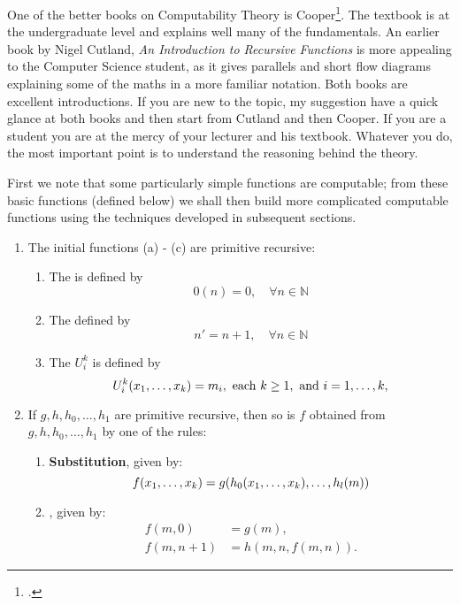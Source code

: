 One of the better books on Computability Theory is Cooper\footcite{cooper2004}. The textbook is at the undergraduate level and explains well many of the fundamentals. An earlier book by Nigel Cutland, \textit{An Introduction to Recursive Functions} is more appealing to the Computer Science student, as it gives parallels and short flow diagrams explaining some of the maths in a more familiar notation. Both books are excellent introductions. If you are new to the topic, my suggestion have a quick glance at both books and then start from Cutland and then Cooper. If you are a student you are at the mercy of your lecturer and his textbook. Whatever you do, the most important point is to understand the reasoning behind the theory.  



First we note that some particularly simple functions are 
computable; from these basic functions (defined below) we 
shall then build more complicated computable functions using the  
techniques developed in subsequent sections. 
\bigskip

\begin{Definition}
\mbox{}
\vspace*{-10pt}
\begin{enumerate}
\item The initial functions (a) - (c) are primitive recursive:

\begin{enumerate}
\item The  is defined by
      \[0(n)=0, \quad \forall n \in \mathbb{N}\]
\item The  defined by
      \[n' = n +1,\quad \forall n \in \mathbb N\]
\item The  $U^k_i$ is defined by
     \[U_i^k(x_1,\dots,x_k) = m_i, \text{ each } k\ge1, \text{ and } i=1,\dots,k, \]      
\end{enumerate}
\item If $g,h,h_0,\dots,h_1$ are primitive recursive, then so is $f$ obtained from  $g,h,h_0,\dots,h_1$ by one of the rules:
\begin{enumerate}
 \item {\upshape \textbf{Substitution}}, given by:
     \[f(x_1,\dots,x_k) = g(h_0(x_1,\dots,x_k),\dots,h_l(m))\]
     
 \item {}, given by:
      \begin{subequations}
       \begin{align}    
         f(m,0)   &= g(m),\\
         f(m,n+1) &=h(m,n,f(m,n)).
       \end{align}
    \end{subequations}   

       
\end{enumerate} 
\end{enumerate}
\end{Definition}

